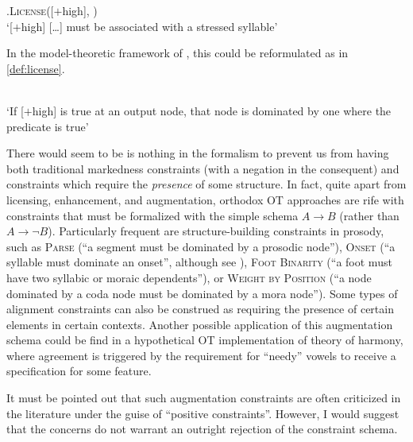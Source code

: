 \ex.\textsc{License}([$+$high], )\\
`[$+$high] [\ldots] must be associated with a stressed syllable'

In the model\hyp theoretic framework of \citet{potts02:_model_ot}, this could be reformulated as in \cref{def:license}.

\begin{constraint}
  \label{def:license}
  \\
  `If [\ensuremath{+}high] is true at an output node, that node is dominated by one where the predicate  is true'
\end{constraint}

There would seem to be is nothing in the formalism to prevent us from having both traditional markedness constraints (with a negation in the consequent) and constraints which require the \emph{presence} of some structure. In fact, quite apart from licensing, enhancement, and augmentation, orthodox OT approaches are rife with constraints that must be formalized with the simple schema $A\to B$ (rather than $A\to\neg B$). Particularly frequent are structure\hyp building constraints in prosody, such as \textsc{Parse} (\enquote{a segment must be dominated by a prosodic node}), \textsc{Onset} (\enquote{a syllable must dominate an onset}, although see \citealp{smith12:_korean}), \textsc{Foot Binarity} (\enquote{a foot must have two syllabic or moraic dependents}), or \textsc{Weight by Position} (\enquote{a node dominated by a coda node must be dominated by a mora node}). Some types of alignment constraints can also be construed as requiring the presence of certain elements in certain contexts. Another possible application of this augmentation schema could be find in a hypothetical OT  implementation of  theory of harmony, where agreement is triggered by the requirement for \enquote{needy} vowels to receive a specification for some feature.

It must be pointed out that such augmentation constraints are often criticized in the literature under the guise of \enquote{positive constraints}. However, I would suggest that the concerns do not warrant an outright rejection of the constraint schema.

